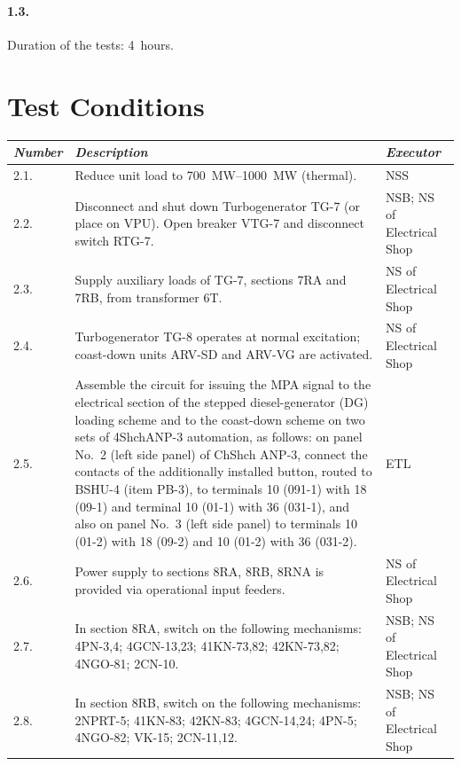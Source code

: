 \documentclass[openright]{bookest}
\begin{document}
\paragraph{1.3.} Duration of the tests: \num{4}~hours.

\section*{Test Conditions}

\small\begin{center}
  \begin{longtable}{|p{3em}|p{20em}|p{7em}|}
    \hline
    \textit{Number} & \textit{Description} & \textit{Executor} \\
    \hline
    2.1. & Reduce unit load to \qtyrange{700}{1000}{\mega\watt} (thermal). & NSS \\
    \hline
    2.2. & Disconnect and shut down Turbogenerator TG-7 (or place on VPU). Open breaker VTG-7 and disconnect switch RTG-7. & NSB; NS of Electrical Shop \\
    \hline
    2.3. & Supply auxiliary loads of TG-7, sections 7RA and 7RB, from transformer 6T. & NS of Electrical Shop \\
    \hline
    2.4. & Turbogenerator TG-8 operates at normal excitation; coast-down units ARV-SD and ARV-VG are activated. & NS of Electrical Shop \\
    \hline
    2.5. & Assemble the circuit for issuing the MPA signal to the electrical section of the stepped diesel-generator (DG) loading scheme and to the coast-down scheme on two sets of 4ShchANP-3 automation, as follows: on panel No.~2 (left side panel) of ChShch ANP-3, connect the contacts of the additionally installed button, routed to BSHU-4 (item PB-3), to terminals 10 (091-1) with 18 (09-1) and terminal 10 (01-1) with 36 (031-1), and also on panel No.~3 (left side panel) to terminals 10 (01-2) with 18 (09-2) and 10 (01-2) with 36 (031-2). & ETL \\
    \hline
    2.6. & Power supply to sections 8RA, 8RB, 8RNA is provided via operational input feeders. & NS of Electrical Shop \\
    \hline
    2.7. & In section 8RA, switch on the following mechanisms: 4PN-3,4; 4GCN-13,23; 41KN-73,82; 42KN-73,82; 4NGO-81; 2CN-10. & NSB; NS of Electrical Shop \\
    \hline
    2.8. & In section 8RB, switch on the following mechanisms: 2NPRT-5; 41KN-83; 42KN-83; 4GCN-14,24; 4PN-5; 4NGO-82; VK-15; 2CN-11,12. & NSB; NS of Electrical Shop \\

\end{longtable}
\end{center}
\end{document}
